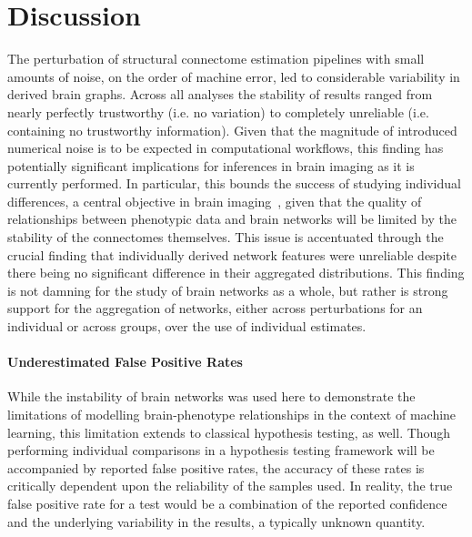 \documentclass[10pt,letterpaper]{article}
\begin{document}
\section*{Discussion}

The perturbation of structural connectome estimation pipelines with small amounts of
noise, on the order of machine error, led to considerable variability in derived brain 
graphs. Across all analyses the stability of results ranged from nearly perfectly
trustworthy (i.e. no variation) to completely unreliable (i.e. containing no
trustworthy information). Given that the magnitude of introduced numerical noise is
to be expected in computational workflows, this finding has potentially significant
implications for inferences in brain imaging as it is currently performed. In
particular, this bounds the success of studying individual differences, a central
objective in brain imaging~\cite{Dubois2016-yr}, given that the quality of
relationships between phenotypic data and brain networks will be limited by the
stability of the connectomes themselves. This issue is accentuated through the
crucial finding that individually derived network features were unreliable despite
there being no significant difference in their aggregated distributions. This finding
is not damning for the study of brain networks as a whole, but rather is strong
support for the aggregation of networks, either across perturbations for an
individual or across groups, over the use of individual estimates.

\paragraph{Underestimated False Positive Rates}
While the instability of brain networks was used here to demonstrate the limitations
of modelling brain-phenotype relationships in the context of machine learning, this
limitation extends to classical hypothesis testing, as well. Though performing
individual comparisons in a hypothesis testing framework will be accompanied by
reported false positive rates, the accuracy of these rates is critically dependent
upon the reliability of the samples used. In reality, the true false positive rate
for a test would be a combination of the reported confidence and the underlying
variability in the results, a typically unknown quantity.
\end{document}

